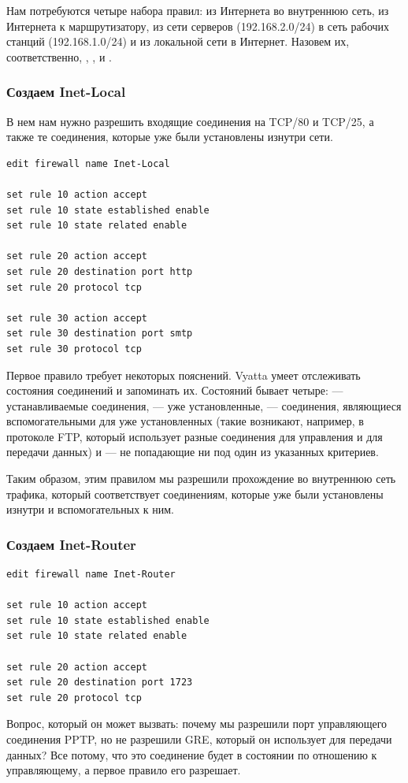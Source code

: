 \documentclass[a4paper,12pt, twoside, russian]{report}
\begin{document}
Нам потребуются четыре набора правил: из Интернета во внутреннюю сеть, из Интернета к маршрутизатору, из
сети серверов (192.168.2.0/24) в сеть рабочих станций (192.168.1.0/24) и из локальной сети в Интернет.
Назовем их, соответственно,
, ,  и .

\subsubsection{Создаем Inet-Local}

В нем нам нужно разрешить входящие соединения на TCP/80 и TCP/25, а также те соединения, которые
уже были установлены изнутри сети.

\begin{verbatim}
edit firewall name Inet-Local

set rule 10 action accept
set rule 10 state established enable
set rule 10 state related enable

set rule 20 action accept
set rule 20 destination port http
set rule 20 protocol tcp

set rule 30 action accept
set rule 30 destination port smtp
set rule 30 protocol tcp
\end{verbatim}

Первое правило требует некоторых пояснений. Vyatta умеет отслеживать состояния соединений и запоминать их.
Состояний бывает четыре:  --- устанавливаемые соединения,  --- уже установленные,
 --- соединения, являющиеся вспомогательными для уже установленных (такие возникают, например,
в протоколе FTP, который использует разные соединения для управления и для передачи данных) и 
--- не попадающие ни под один из указанных критериев.

Таким образом, этим правилом мы разрешили прохождение во внутреннюю сеть трафика, который соответствует соединениям,
которые уже были установлены изнутри и вспомогательных к ним.

\subsubsection{Создаем Inet-Router}
\begin{verbatim}
edit firewall name Inet-Router

set rule 10 action accept
set rule 10 state established enable
set rule 10 state related enable

set rule 20 action accept
set rule 20 destination port 1723
set rule 20 protocol tcp

\end{verbatim}
Вопрос, который он может вызвать: почему мы разрешили порт управляющего соединения PPTP, но не разрешили GRE,
который он использует для передачи данных? Все потому, что это соединение будет в состоянии  
по отношению к управляющему, а первое правило его разрешает.
\end{document}
